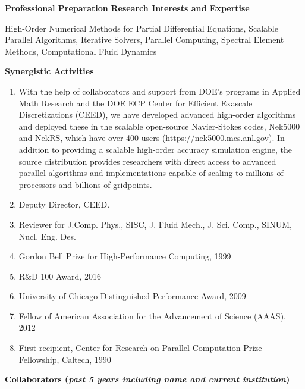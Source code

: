 \documentclass[11pt,letterpaper,english]{article}
\begin{document}
\begin{flushleft} {\bf Professional Preparation}
\vspace{-6pt}
{\bf Research Interests and Expertise}
{\parindent 16pt

High-Order Numerical Methods for Partial Differential Equations, Scalable Parallel Algorithms, Iterative Solvers, Parallel Computing, Spectral Element Methods, Computational Fluid Dynamics
}

\vspace{.04in}
{\bf Synergistic Activities}
\vspace{-6pt}
\begin{enumerate} \itemsep1pt \parskip0pt 
%
 \item With the help of collaborators and support from DOE's programs in
Applied Math Research and the DOE ECP Center for Efficient Exascale
Discretizations (CEED), we have developed advanced high-order algorithms and
deployed these in the scalable open-source Navier-Stokes codes, Nek5000 and
NekRS, which have over 400 users (https://nek5000.mcs.anl.gov). In addition to
providing a scalable high-order accuracy simulation engine, the source
distribution provides researchers with direct access to advanced parallel
algorithms and implementations capable of scaling to millions of processors and
billions of gridpoints. \\
%
\item Deputy Director, CEED.
%
\item Reviewer for J.Comp. Phys., SISC, J. Fluid Mech., J. Sci. Comp., SINUM, Nucl. Eng. Des. \\
%
 \item Gordon Bell Prize for High-Performance Computing, 1999
%
 \item R\&D 100 Award, 2016
%
 \item University of Chicago Distinguished Performance Award, 2009
%
 \item Fellow of American Association for the Advancement of Science (AAAS), 2012
%
 \item First recipient, Center for Research on Parallel Computation Prize Fellowship, Caltech, 1990
\end{enumerate}

\vspace{-6pt}
{\bf Collaborators ({\emph{past 5 years including name and current institution}})}
{\parindent 16pt


}
\end{flushleft}
\end{document}
